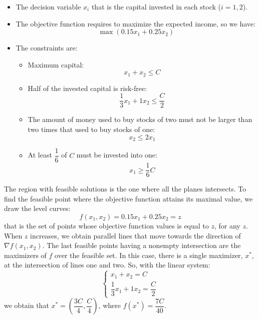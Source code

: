 \documentclass[12pt, a4paper]{report}
\newtheorem[style=M,bodystyle=\normalfont]{theorem}{Theorem}
\newtheorem[style=M,bodystyle=\normalfont]{corollary}{Corollary}
\newtheorem[style=M,bodystyle=\normalfont]{lemma}{Lemma}
\newtheorem[style=M,bodystyle=\normalfont]{definition}{Definition}
\begin{document}
\begin{Answer}[ref=1]
    \begin{itemize}
        \item The decision variable $x_i$ that is the capital invested in each stock ($i=1,2$).
        \item The objective function requires to maximize the expected income, so we have: 
            \[\max{\left(0.15x_1+0.25x_2\right)}\]
        \item The constraints are:
            \begin{itemize}
                \item Maximum capital: 
                    \[x_1+x_2 \leq C\]
                \item Half of the invested capital is risk-free:
                    \[\dfrac{1}{3}x_1+1x_2 \leq \dfrac{C}{2}\]
                \item The amount of money used to buy stocks of two must not be larger than two times that used to buy stocks of one:
                    \[x_2 \leq 2x_1\]
                \item At least $\dfrac{1}{6}$ of $C$ must be invested into one: 
                    \[x_1 \geq \dfrac{1}{6}C\]
            \end{itemize}
    \end{itemize}
    The region with feasible solutions is the one where all the planes intersects. To find the feasible point where the objective function attains its maximal value, we draw the 
    level curves: 
    \[f(x_1,x_2)=0.15x_1+0.25x_2=z\]
    that is the set of points whose objective function values is equal to $z$, for any $z$. When $z$ increases, we obtain parallel lines that move towards the direction of
    $\nabla f(x_1,x_2)$. The last feasible points having a nonempty intersection are the maximizers of $f$ over the feasible set. In this case, there is a single maximizer, $x^{*}$, 
    at the intersection of lines one and two. So, with the linear system: 
    \[
    \begin{cases}
        x_1+x_2 = C \\
        \dfrac{1}{3}x_1+1x_2 = \dfrac{C}{2}
    \end{cases} 
    \]
    we obtain that $x^{*}=\left( \dfrac{3C}{4},\dfrac{C}{4} \right)$, where $f(x^{*})=\dfrac{7C}{40}$. 
\end{Answer}

\newpage
\end{document}
